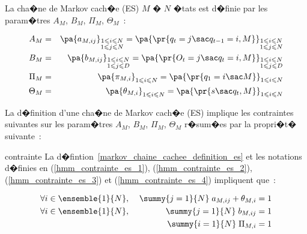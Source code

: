 La cha�ne de Markov cach�e (ES) $M$ � $N$ �tats est d�finie par les param�tres $A_M$, $B_M$, $\Pi_M$, $\Theta_M$~:

        \begin{eqnarray}
        A_M    &=& \pa {  a_{M,ij} } _ {\substack{ 1\leqslant i\leqslant N\\1\leqslant j\leqslant N}} =
                   \pa{ \pr {  q_{t}=j \sac  q_{t-1} =i,M } } _{\substack{1\leqslant i\leqslant N\\
                                                                               1\leqslant j\leqslant N}} \label{hmm_contrainte_es_1}\\
        B_M    &=& \pa{   b_{M,ij} } _ {\substack{1\leqslant i\leqslant N\\1\leqslant j\leqslant D}}=
                   \pa { \pr{ O_{t}=j \sac  q_{t}=i,M } }     _ {\substack{1\leqslant i\leqslant N
                                                                               \\1\leqslant j\leqslant D}} \label{hmm_contrainte_es_2}\\
        \Pi_M  &=& \pa { \pi_{M,i} } _ { 1 \leqslant i \leqslant N } = \pa { \pr {  q_1 = i \sac M} } _ 
                                                                        { 1 \leqslant i \leqslant N } \label{hmm_contrainte_es_3} \\
        \Theta_M  &=& \pa { \theta_{M,i} } _ { 1 \leqslant i \leqslant N } = \pa { \pr {  s \sac q_{t}, M} } _ 
                                                                                { 1 \leqslant i \leqslant N } \label{hmm_contrainte_es_4}
        \end{eqnarray}


La d�finition d'une cha�ne de Markov cach�e (ES) implique les contraintes suivantes sur les param�tres $A_M$, $B_M$, $\Pi_M$, $\Theta_M$
r�sum�es par la propri�t� suivante~:


        \begin{xproperty}{contrainte}
        \label{propriete_mmc_contrainte_es}%
        La d�fintion~\ref{markov_chaine_cachee_definition_es} et les notations d�finies en (\ref{hmm_contrainte_es_1}),
        (\ref{hmm_contrainte_es_2}), (\ref{hmm_contrainte_es_3}) et (\ref{hmm_contrainte_es_4}) impliquent que~:
        
                \begin{eqnarray}
                \forall i\in \ensemble{1}{N}, \; && \summy{j=1}{N} \; a_{M,ij} + \theta_{M,i} =1 \\
                \forall i\in \ensemble{1}{N}, \; &&\summy{j=1}{N} \; b_{M,ij}=1 \\
                                                 &&\summy{i=1}{N} \; \Pi_{M,i} = 1
                \end{eqnarray}
        \end{xproperty}
        
